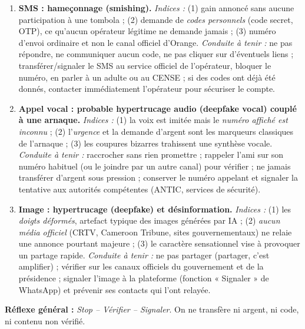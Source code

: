 \documentclass[11pt]{article}
\begin{document}
\begin{corrige}
\begin{enumerate}
\item \textbf{SMS : hameçonnage (smishing).} \emph{Indices :} (1) gain annoncé sans aucune participation à une tombola ; (2) demande de \emph{codes personnels} (code secret, OTP), ce qu'aucun opérateur légitime ne demande jamais ; (3) numéro d'envoi ordinaire et non le canal officiel d'Orange. \emph{Conduite à tenir :} ne pas répondre, ne communiquer aucun code, ne pas cliquer sur d'éventuels liens ; transférer/signaler le SMS au service officiel de l'opérateur, bloquer le numéro, en parler à un adulte ou au CENSE ; si des codes ont déjà été donnés, contacter immédiatement l'opérateur pour sécuriser le compte.
\item \textbf{Appel vocal : probable hypertrucage audio (deepfake vocal) couplé à une arnaque.} \emph{Indices :} (1) la voix est imitée mais le \emph{numéro affiché est inconnu} ; (2) l'\emph{urgence} et la demande d'argent sont les marqueurs classiques de l'arnaque ; (3) les coupures bizarres trahissent une synthèse vocale. \emph{Conduite à tenir :} raccrocher sans rien promettre ; rappeler l'ami sur son numéro habituel (ou le joindre par un autre canal) pour vérifier ; ne jamais transférer d'argent sous pression ; conserver le numéro appelant et signaler la tentative aux autorités compétentes (ANTIC, services de sécurité).
\item \textbf{Image : hypertrucage (deepfake) et désinformation.} \emph{Indices :} (1) les \emph{doigts déformés}, artefact typique des images générées par IA ; (2) \emph{aucun média officiel} (CRTV, Cameroon Tribune, sites gouvernementaux) ne relaie une annonce pourtant majeure ; (3) le caractère sensationnel vise à provoquer un partage rapide. \emph{Conduite à tenir :} ne pas partager (partager, c'est amplifier) ; vérifier sur les canaux officiels du gouvernement et de la présidence ; signaler l'image à la plateforme (fonction « Signaler » de WhatsApp) et prévenir ses contacts qui l'ont relayée.
\end{enumerate}
\textbf{Réflexe général :} \emph{Stop -- Vérifier -- Signaler}. On ne transfère ni argent, ni code, ni contenu non vérifié.
\end{corrige}
\end{document}
